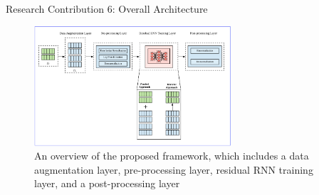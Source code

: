 \documentclass{beamer}
\begin{document}
\begin{frame}{Research Contribution 6: Overall Architecture }
   \begin{figure}[htbp]
\centerline{\includegraphics[width=0.65\textwidth]{images/rp5_arch}}
\caption{ \tiny An overview of the proposed framework, which includes a data augmentation layer, pre-processing
layer, residual RNN training layer, and a post-processing layer}
\label{forecastingarch}
\end{figure}
\end{frame}
\end{document}
